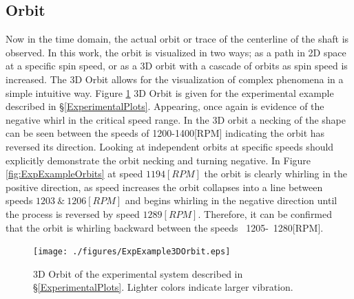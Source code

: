 \subsection{Orbit}
Now in the time domain, the actual orbit or trace of the centerline of the shaft is observed. In this work, the orbit is visualized in two ways; as a path in 2D space at a specific spin speed, or as a 3D orbit with a cascade of orbits as spin speed is increased. The 3D Orbit allows for the visualization of complex phenomena in a simple intuitive way. Figure \ref{fig:ExpExample3DOrbit} 3D Orbit is given for the experimental example described in \S\ref{ExperimentalPlots}. Appearing, once again is evidence of the negative whirl in the critical speed range. In the 3D orbit a necking of the shape can be seen between the speeds of 1200-1400[RPM] indicating the orbit has reversed its direction. Looking at independent orbits at specific speeds should explicitly demonstrate the orbit necking and turning negative. In Figure \ref{fig:ExpExampleOrbits} at speed $ 1194[RPM] $ the orbit is clearly whirling in the positive direction, as speed increases the orbit collapses into a line between speeds $ 1203\ \&\ 1206[RPM] $ and begins whirling in the negative direction until the process is reversed by speed $ 1289[RPM] $. Therefore, it can be confirmed that the orbit is whirling backward between the speeds ~1205-~1280[RPM].\par
\begin{figure}
	\centering
	\texttt{[image: ./figures/ExpExample3DOrbit.eps]}
	\caption{3D Orbit of the experimental system described in \S\ref{ExperimentalPlots}. Lighter colors indicate larger vibration.}
	\label{fig:ExpExample3DOrbit}
\end{figure}
